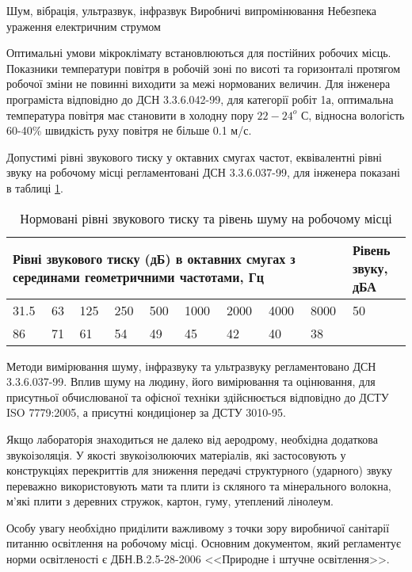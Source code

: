 Шум, вібрація, ультразвук, інфразвук
Виробничі випромінювання
Небезпека ураження електричним струмом






Оптимальні умови мікроклімату встановлюються для постійних робочих місць. Показники температури повітря в робочій зоні по висоті та горизонталі протягом робочої зміни не повинні виходити за межі нормованих величин. Для інженера програміста відповідно до ДСН 3.3.6.042-99, для категорії робіт 1а, оптимальна температура повітря має становити в холодну пору $22-24^o$ С, відносна вологість 60-40\% швидкість руху повітря не більше 0.1 м/с.

Допустимі рівні звукового тиску у октавних смугах частот, еквівалентні рівні звуку на робочому місці регламентовані ДСН 3.3.6.037-99, для інженера показані в таблиці \ref{tb:noise}.
\begin{table}[H]
\small
\caption{Нормовані рівні звукового тиску та рівень шуму на робочому місці}
\centering
\begin{tabular}{|p{0.4in}|p{0.4in}|p{0.4in}|p{0.4in}|p{0.4in}|p{0.4in}|p{0.4in}|p{0.4in}|p{0.4in}|p{0.4in}|} \hline 
\multicolumn{9}{|p{4in}|}{Рівні звукового тиску (дБ) в  октавних смугах з серединами геометричними частотами, Гц} & Рівень звуку, дБА \\ \hline 
31.5 & 63 & 125 & 250 & 500 & 1000 & 2000 & 4000 & 8000 & 50 \\ \hline 
86 & 71 & 61 & 54 & 49 & 45 & 42 & 40 & 38 &  \\ \hline 
\end{tabular}
\label{tb:noise}
\end{table}
Методи вимірювання шуму, інфразвуку та ультразвуку регламентовано ДСН 3.3.6.037-99. Вплив шуму на людину, його вимірювання та оцінювання, для присутньої обчислюваної та офісної техніки здійснюється відповідно до ДСТУ ISO 7779:2005, а присутні кондиціонер за ДСТУ 3010-95. 

Якщо лабораторія знаходиться не далеко від аеродрому, необхідна додаткова звукоізоляція. У якості звукоізолюючих матеріалів, які застосовують у конструкціях перекриттів для зниження передачі структурного (ударного) звуку переважно використовують мати та плити із скляного та мінерального волокна, м'які плити з деревних стружок, картон, гуму, утеплений лінолеум.

Особу увагу необхідно приділити важливому з точки зору виробничої санітарії питанню освітлення на робочому місці. Основним документом, який регламентує норми освітленості є ДБН.В.2.5-28-2006 <<Природне і штучне освітлення>>. 

